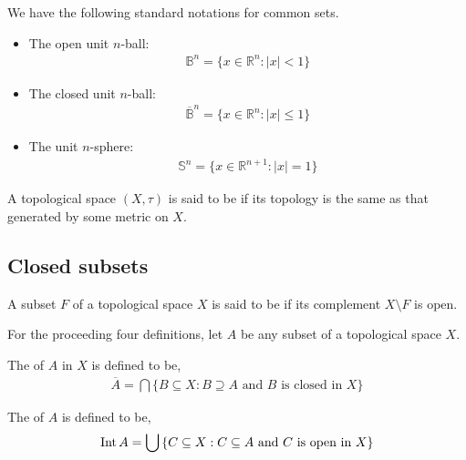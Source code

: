 \begin{notation}
	We have the following standard notations for common sets.
	\begin{itemize}
		\item The open unit $ n $-ball:
		      \begin{align*}
			      \mathbb{B}^{n} = \{ x \in \mathbb{R}^{n}: | x | < 1 \}
		      \end{align*}
		\item The closed unit $ n $-ball:
		      \begin{align*}
			      \overline{\mathbb{B}}^{n} = \{ x \in \mathbb{R}^{n}: | x | \leq 1 \}
		      \end{align*}
		\item The unit $ n $-sphere:
		      \begin{align*}
			      \mathbb{S}^{n} = \{ x \in \mathbb{R}^{n+1}: | x | = 1 \}
		      \end{align*}
	\end{itemize}
\end{notation}

\begin{definition}[Metrizable]
	A topological space $ ( X, \tau ) $ is said to be  if its topology is the same as that generated by some metric on $ X $.
\end{definition}

\subsection{Closed subsets}
\begin{definition}
	A subset $ F $ of a topological space $ X $ is said to be  if its complement $ X \setminus F $ is open.
\end{definition}

For the proceeding four definitions, let $ A $ be any subset of a topological space $ X $.

\begin{definition}[Closure]
	The  of $ A $  in $ X $ is defined to be,
	\begin{align*}
		\overline{A} = \bigcap{\{ B \subseteq X: B \supseteq A \text{ and } B \text{ is closed in } X \}}
	\end{align*}
\end{definition}

\begin{definition}[Interior]
	The  of $ A $ is defined to be,
	\begin{align*}
		\operatorname{Int}{A} = \bigcup{\{ C \subseteq X: C \subseteq A \text{ and } C \text{ is open in } X \}}
	\end{align*}
\end{definition}

